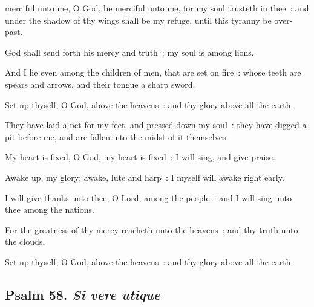 merciful unto me, O God, be merciful unto me, for my soul trusteth in thee~: and under the shadow of thy wings shall be my refuge, until this tyranny be over-past.\par
{}
God shall send forth his mercy and truth~: my soul is among lions.\par
{}And I lie even among the children of men, that are set on fire~: whose teeth are spears and arrows, and their tongue a sharp sword.\par
{}Set up thyself, O God, above the heavens~: and thy glory above all the earth.\par
{}They have laid a net for my feet, and pressed down my soul~: they have digged a pit before me, and are fallen into the midst of it themselves.\par
{}My heart is fixed, O God, my heart is fixed~: I will sing, and give praise.\par
{}Awake up, my glory; awake, lute and harp~: I myself will awake right early.\par
{}I will give thanks unto thee, O Lord, among the people~: and I will sing unto thee among the nations.\par
{}For the greatness of thy mercy reacheth unto the heavens~: and thy truth unto the clouds.\par
{}Set up thyself, O God, above the heavens~: and thy glory above all the earth.\par


\clearpage
\subsection{Psalm 58. \textit{Si vere utique}}


